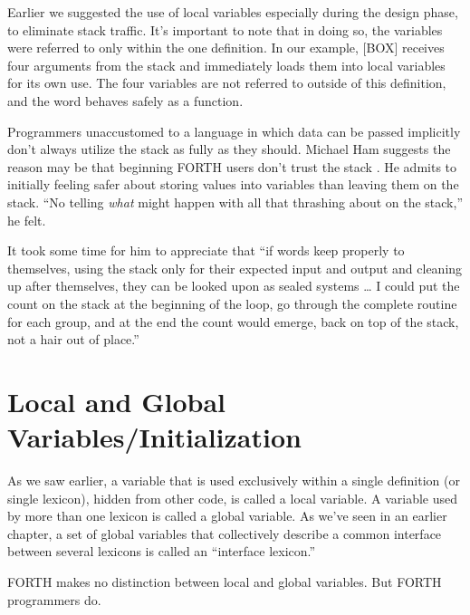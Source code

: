 
Earlier we suggested the use of local variables especially during the
design phase, to eliminate stack traffic. It's important to note that in
doing so, the variables were referred to only within the one definition. In
our example, [BOX] receives four arguments from the stack and immediately
loads them into local variables for its own use. The four variables are not
referred to outside of this definition, and the word behaves safely as a
function.

Programmers unaccustomed to a language in which data can be
passed implicitly don't always utilize the stack as fully as they should.
Michael Ham suggests the reason may be that beginning FORTH users
don't trust the stack \cite{ham83}. He admits to initially feeling safer about storing
values into variables than leaving them on the stack. ``No telling \emph{what}
might happen with all that thrashing about on the stack,'' he felt.

It took some time for him to appreciate that ``if words keep properly
to themselves, using the stack only for their expected input and output
and cleaning up after themselves, they can be looked upon as sealed
systems \dots{} I could put the count on the stack at the beginning of the
loop, go through the complete routine for each group, and at the end the
count would emerge, back on top of the stack, not a hair out of place.''

\section{Local and Global Variables/Initialization}

As we saw earlier, a variable that is used exclusively within a single
definition (or single lexicon), hidden from other code, is called a local
variable. A variable used by more than one lexicon is called a global
variable. As we've seen in an earlier chapter, a set of global variables that
collectively describe a common interface between several lexicons is
called an ``interface lexicon.''

FORTH makes no distinction between local and global variables.
But FORTH programmers do.

